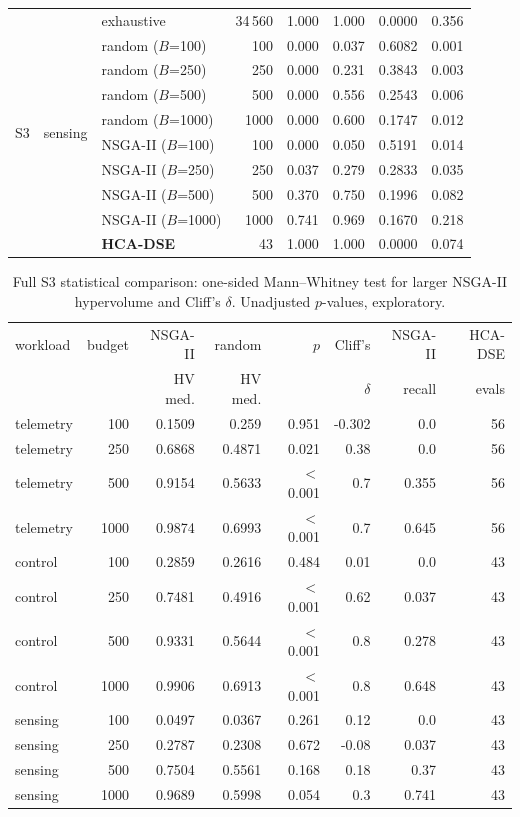 \documentclass[pdflatex,sn-nature]{sn-jnl}
\theoremstyle{thmstyleone}
\theoremstyle{thmstyletwo}
\theoremstyle{thmstylethree}
\begin{document}
\begin{table}[!htbp]
{\begin{tabular}{lllrrrrr}
\midrule
\multirow{10}{*}{S3} & \multirow{10}{*}{sensing} & exhaustive & 34\,560 & 1.000 & 1.000 & 0.0000 & 0.356 \\
 & & random ($B$=100) & 100 & 0.000 & 0.037 & 0.6082 & 0.001 \\
 & & random ($B$=250) & 250 & 0.000 & 0.231 & 0.3843 & 0.003 \\
 & & random ($B$=500) & 500 & 0.000 & 0.556 & 0.2543 & 0.006 \\
 & & random ($B$=1000) & 1000 & 0.000 & 0.600 & 0.1747 & 0.012 \\
 & & NSGA-II ($B$=100) & 100 & 0.000 & 0.050 & 0.5191 & 0.014 \\
 & & NSGA-II ($B$=250) & 250 & 0.037 & 0.279 & 0.2833 & 0.035 \\
 & & NSGA-II ($B$=500) & 500 & 0.370 & 0.750 & 0.1996 & 0.082 \\
 & & NSGA-II ($B$=1000) & 1000 & 0.741 & 0.969 & 0.1670 & 0.218 \\
 & & \textbf{HCA-DSE} & 43 & 1.000 & 1.000 & 0.0000 & 0.074 \\
\bottomrule
\end{tabular}}
\end{table}

\begin{table}[!htbp]\centering
\caption{Full S3 statistical comparison: one-sided Mann--Whitney test for larger NSGA-II
hypervolume and Cliff's $\delta$. Unadjusted $p$-values, exploratory.}\label{tabS3}
{\let\scriptsize\tiny\setlength{\tabcolsep}{2pt}\scriptsize
\setlength{\tabcolsep}{3.5pt}
\begin{tabular}{lrrrrrrr}
\toprule
workload & budget & NSGA-II & random & $p$ & Cliff's & NSGA-II & HCA-DSE \\
 & & HV med. & HV med. & & $\delta$ & recall & evals \\
\midrule
telemetry & 100 & 0.1509 & 0.259 & 0.951 & -0.302 & 0.0 & 56 \\
telemetry & 250 & 0.6868 & 0.4871 & 0.021 & 0.38 & 0.0 & 56 \\
telemetry & 500 & 0.9154 & 0.5633 & $<$0.001 & 0.7 & 0.355 & 56 \\
telemetry & 1000 & 0.9874 & 0.6993 & $<$0.001 & 0.7 & 0.645 & 56 \\
control & 100 & 0.2859 & 0.2616 & 0.484 & 0.01 & 0.0 & 43 \\
control & 250 & 0.7481 & 0.4916 & $<$0.001 & 0.62 & 0.037 & 43 \\
control & 500 & 0.9331 & 0.5644 & $<$0.001 & 0.8 & 0.278 & 43 \\
control & 1000 & 0.9906 & 0.6913 & $<$0.001 & 0.8 & 0.648 & 43 \\
sensing & 100 & 0.0497 & 0.0367 & 0.261 & 0.12 & 0.0 & 43 \\
sensing & 250 & 0.2787 & 0.2308 & 0.672 & -0.08 & 0.037 & 43 \\
sensing & 500 & 0.7504 & 0.5561 & 0.168 & 0.18 & 0.37 & 43 \\
sensing & 1000 & 0.9689 & 0.5998 & 0.054 & 0.3 & 0.741 & 43 \\
\bottomrule
\end{tabular}}
\end{table}
\end{document}

